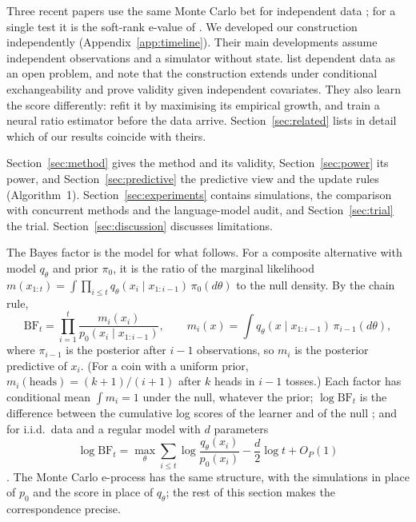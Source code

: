 Three recent papers use the same Monte Carlo bet for independent data
\citep{dombowsky2026besag,forre2026anytime,cortinovis2026slice}; for a single
test it is the soft-rank e-value of \citet{wang2022false}. We developed our
construction independently (Appendix~\ref{app:timeline}). Their main
developments assume independent observations and a simulator without state.
\citet{forre2026anytime} list dependent data as an open problem, and
\citet[Appendix~C.1.1]{cortinovis2026slice} note that the construction extends
under conditional exchangeability and prove validity given independent
covariates. They also learn the score differently: \citet{forre2026anytime}
refit it by maximising its empirical growth, and \citet{cortinovis2026slice}
train a neural ratio estimator before the data arrive. Section~\ref{sec:related}
lists in detail which of our results coincide with theirs.

Section~\ref{sec:method} gives the method and its validity,
Section~\ref{sec:power} its power, and Section~\ref{sec:predictive} the
predictive view and the update rules (Algorithm~1). Section~\ref{sec:experiments}
contains simulations, the comparison with concurrent methods and the
language-model audit, and Section~\ref{sec:trial} the trial.
Section~\ref{sec:discussion} discusses limitations.


The Bayes factor is the model for what follows. For a composite alternative
with model $q_\theta$ and prior $\pi_0$, it is the ratio of the marginal
likelihood $m(x_{1:t}) = \int \prod_{i \le t} q_\theta(x_i \mid x_{1:i-1})\,
\pi_0(d\theta)$ to the null density. By the chain rule,
\begin{equation}\label{eq:prequential}
\mathrm{BF}_t = \prod_{i=1}^{t} \frac{m_i(x_i)}{p_0(x_i \mid x_{1:i-1})},
\qquad
m_i(x) = \int q_\theta(x \mid x_{1:i-1})\,\pi_{i-1}(d\theta),
\end{equation}
where $\pi_{i-1}$ is the posterior after $i-1$ observations, so $m_i$ is the
posterior predictive of $x_i$. (For a coin with a uniform prior,
$m_i(\text{heads}) = (k+1)/(i+1)$ after $k$ heads in $i-1$ tosses.) Each
factor has conditional mean $\int m_i = 1$ under the null, whatever the prior;
$\log \mathrm{BF}_t$ is the difference between the cumulative log scores of
the learner and of the null \citep{dawid1984present}; and for i.i.d.\ data
and a regular model with $d$ parameters
\[
\log \mathrm{BF}_t = \max_\theta \sum_{i \le t} \log\frac{q_\theta(x_i)}{p_0(x_i)}
- \frac d2 \log t + O_P(1)
\]
\citep{clarke1990information}. The Monte Carlo e-process has the same
structure, with the simulations in place of $p_0$ and the score in place of
$q_\theta$; the rest of this section makes the correspondence precise.
